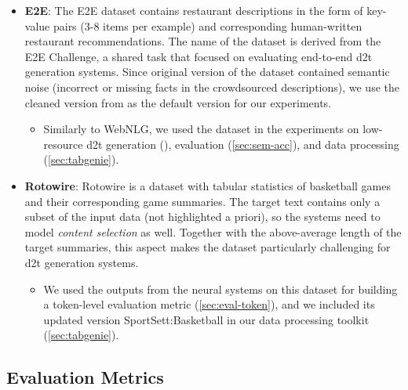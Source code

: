 {\begin{itemize}
  \item \textbf{E2E}: The E2E dataset \cite{dusekEvaluatingStateoftheartEndtoEnd2020} contains restaurant descriptions in the form of key-value pairs (3-8 items per example) and corresponding human-written restaurant recommendations. The name of the dataset is derived from the E2E Challenge, a shared task that focused on evaluating end-to-end \ac{d2t} generation systems. Since original version of the dataset contained semantic noise (incorrect or missing facts in the crowdsourced descriptions), we use the cleaned version from \citet{dusekSemanticNoiseMatters2019} as the default version for our experiments.
        \begin{itemize}
          \item
                Similarly to WebNLG, we used the dataset in the experiments on low-resource \ac{d2t} generation (), evaluation (\autoref{sec:sem-acc}), and data processing (\autoref{sec:tabgenie}).
        \end{itemize}

  \item \textbf{Rotowire}: Rotowire \cite{wiseman2017challenges} is a dataset with tabular statistics of basketball games and their corresponding game summaries. The target text contains only a subset of the input data (not highlighted a priori), so the systems need to model \emph{content selection} as well. Together with the above-average length of the target summaries, this aspect makes the dataset particularly challenging for \ac{d2t} generation systems.
        \begin{itemize}
          \item
                We used the outputs from the neural systems on this dataset for building a token-level evaluation metric (\autoref{sec:eval-token}), and we included its updated version SportSett:Basketball \cite{thomson2020sportsett} in our data processing toolkit (\autoref{sec:tabgenie}).
        \end{itemize}
\end{itemize}



\subsection{Evaluation Metrics}
\label{sec:evaluation}

}
